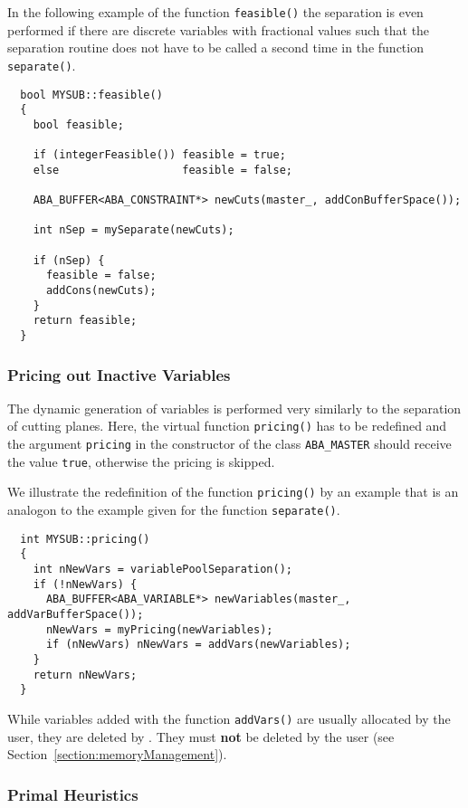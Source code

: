 In the following example of the function {\tt feasible()} the separation 
is even performed if there are discrete variables with fractional values
such that the separation routine does not have to be called a second
time in the function {\tt separate()}.
\begin{verbatim}
  bool MYSUB::feasible()
  {
    bool feasible;
 
    if (integerFeasible()) feasible = true;
    else                   feasible = false;
 
    ABA_BUFFER<ABA_CONSTRAINT*> newCuts(master_, addConBufferSpace());
      
    int nSep = mySeparate(newCuts);
 
    if (nSep) {
      feasible = false;
      addCons(newCuts);
    }
    return feasible;
  }
\end{verbatim}

\subsubsection{Pricing out Inactive Variables}

The dynamic generation of variables is performed very similarly to the
separation of cutting planes. Here, the virtual function {\tt pricing()}
has to be redefined and the argument
{\tt pricing} in the constructor of the class {\tt ABA\_MASTER} should receive
the value {\tt true}, otherwise the pricing is skipped.

We illustrate the redefinition of the function {\tt pricing()} by an
example that is an analogon to the example given for the function 
{\tt separate()}.
\begin{verbatim}
  int MYSUB::pricing()
  {
    int nNewVars = variablePoolSeparation();
    if (!nNewVars) {
      ABA_BUFFER<ABA_VARIABLE*> newVariables(master_, addVarBufferSpace());
      nNewVars = myPricing(newVariables);
      if (nNewVars) nNewVars = addVars(newVariables);
    }
    return nNewVars;
  }
\end{verbatim}

While variables added with the function {\tt addVars()} are usually
allocated by the user, they are deleted by \ABACUS. They must {\bf
  not} be deleted by the user (see Section~\ref{section:memoryManagement}).

\subsubsection{Primal Heuristics}

